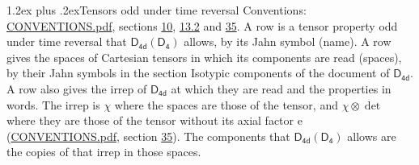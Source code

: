 \documentclass[10pt,a4paper]{article}
\makeatletter
\renewcommand\section{\@startsection{section}{1}{\z@}{-3ex plus -1ex minus -.2ex}%
  {1.2ex plus .2ex}{\normalfont\large\sffamily\bfseries\color{parttitle}}}
\numberwithin{equation}{section}
\newcommand{\grp}[1]{\mathsf{#1}}
\newcommand{\irrprod}{\otimes}
\makeatother
\begin{document}
\section{Tensors odd under time reversal}\label{s:time_odd}
Conventions: \href{../../CONVENTIONS.pdf}{CONVENTIONS.pdf}, sections \href{../../../rotation/CONVENTIONS.pdf\#conv.10}{10}, \href{../../../rotation/CONVENTIONS.pdf\#conv.13.2}{13.2} and \href{../../CONVENTIONS.pdf\#conv.35}{35}.
\leavevmode\label{n:head.name.property}A row is a tensor property odd under time reversal that $\grp{D_{4d}}(\grp{D_{4}})$ allows, by its Jahn symbol (name). \label{n:head.spaces}A row gives the spaces of Cartesian tensors in which its components are read (spaces), by their Jahn symbols in the section Isotypic components of the document of \href{../../../rotation/data/pdf/D4d.pdf}{$\grp{D_{4d}}$}. \label{n:head.properties}A row also gives the irrep of $\grp{D_{4d}}$ at which they are read and the properties in words. The irrep is $\chi$ where the spaces are those of the tensor, and $\chi \irrprod \det$ where they are those of the tensor without its axial factor e (\href{../../CONVENTIONS.pdf}{CONVENTIONS.pdf}, section \href{../../CONVENTIONS.pdf\#conv.35}{35}). The components that $\grp{D_{4d}}(\grp{D_{4}})$ allows are the copies of that irrep in those spaces.
\end{document}
